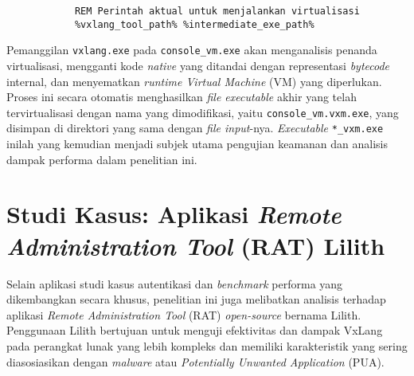 \begin{enumerate}
\begin{itemize}
\begin{listing}[H]
\begin{verbatim}
            REM Perintah aktual untuk menjalankan virtualisasi
            %vxlang_tool_path% %intermediate_exe_path%
            \end{verbatim}
            \label{lst:virtualize_bat_example_bab4}
            \end{listing}
        Pemanggilan \texttt{vxlang.exe} pada \texttt{console\_vm.exe} akan menganalisis penanda virtualisasi, mengganti kode \textit{native} yang ditandai dengan representasi \textit{bytecode} internal, dan menyematkan \textit{runtime Virtual Machine} (VM) yang diperlukan. Proses ini secara otomatis menghasilkan \textit{file executable} akhir yang telah tervirtualisasi dengan nama yang dimodifikasi, yaitu \texttt{console\_vm.vxm.exe}, yang disimpan di direktori yang sama dengan \textit{file input}-nya. \textit{Executable} \texttt{*\_vxm.exe} inilah yang kemudian menjadi subjek utama pengujian keamanan dan analisis dampak performa dalam penelitian ini.
    \end{itemize}
\end{enumerate}

\section{Studi Kasus: Aplikasi \textit{Remote Administration Tool} (RAT) Lilith}
\label{sec:implementasi_lilith} 
Selain aplikasi studi kasus autentikasi dan \textit{benchmark} performa yang dikembangkan secara khusus, penelitian ini juga melibatkan analisis terhadap aplikasi \textit{Remote Administration Tool} (RAT) \textit{open-source} bernama Lilith. Penggunaan Lilith bertujuan untuk menguji efektivitas dan dampak VxLang pada perangkat lunak yang lebih kompleks dan memiliki karakteristik yang sering diasosiasikan dengan \textit{malware} atau \textit{Potentially Unwanted Application} (PUA).

